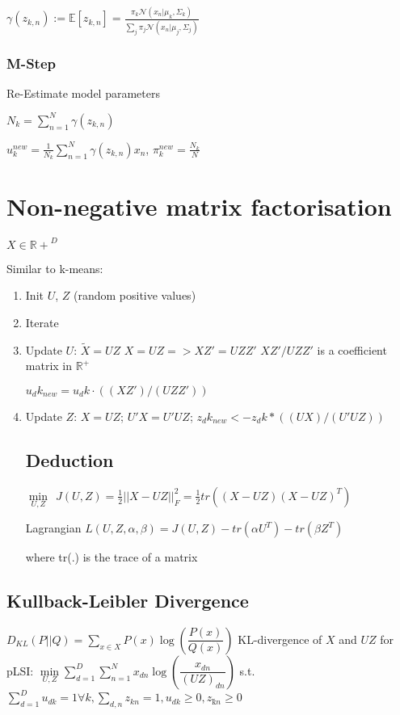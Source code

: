 \documentclass[11pt,twocolumn]{article}
\begin{document}
$\gamma(z_{k,n}):=\mathbb{E}[z_{k,n}] = \frac{\pi_k \mathcal{N}(x_n|\mu_k, \Sigma_k)}{\sum_j \pi_j \mathcal{N}(x_n|\mu_j, \Sigma_j)}$


\subsubsection{M-Step} Re-Estimate model parameters

$N_k = \sum_{n=1}^N{\gamma(z_{k,n})}$

$u_k^{new} = \frac{1}{N_k} \sum_{n=1}^N{\gamma(z_{k,n})x_n}$, $\pi_k^{new}= \frac{N_k}{N}$


\section{Non-negative matrix factorisation}

$X \in \mathbb{R+}^{D}$ 
 
Similar to k-means:
\begin{enumerate}


\item Init $U$, $Z$ (random positive values)
\item Iterate
\item Update $U$:
$\tilde{X} = UZ$
$X = UZ => XZ' = UZZ'$
$XZ'/UZZ'$ is a coefficient matrix in $\mathbb{R^+}$ 


$u_dk_{new} = u_dk \cdot ( (XZ')/(UZZ') )$

\item Update $Z$: $X = UZ$;  $U'X = U'UZ$; $z_dk_{new} <- z_dk * ( (UX)/(U'UZ) )$

\subsection{Deduction}

${\min\limits_{U,Z}} ~~ J(U,Z) = \frac{1}{2} ||X-UZ||_F^2 = \frac{1}{2} tr\left( (X-UZ)(X-UZ)^T \right)$

Lagrangian $L(U,Z,\alpha, \beta)=J(U,Z)-tr(\alpha U^T) - tr(\beta Z^T)$

where tr(.) is the trace of a matrix

\end{enumerate}
\subsection{Kullback-Leibler Divergence}
$D_{KL}(P||Q) = \sum_{x \in X} P(x) \log \left( \dfrac{P(x)}{Q(x)}\right)$
KL-divergence of $X$ and $UZ$ for pLSI:
$\min\limits_{U,Z}\sum_{d=1}^D\sum_{n=1}^N x_{dn}\log\left(\dfrac{x_{dn}}{(UZ)_{dn}}\right)$ s.t. $ \sum_{d=1}^D u_{dk} =1 \forall k, \sum_{d,n}z_{kn}=1, u_{dk}\geq0,z_{ḱn}\geq0$
\end{document}

